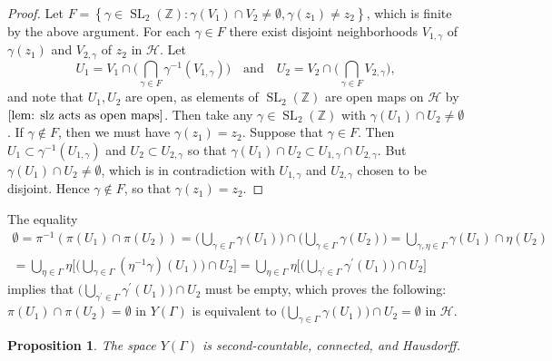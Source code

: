 \documentclass[10pt,leqno,twoside]{article}
\theoremstyle{plain}
\newtheorem{proposition}[lem]{Proposition}
\theoremstyle{definition}
\numberwithin{equation}{section}
\numberwithin{lem}{section}
\newcommand{\cbr}[1]{\left\{#1\right\}}
\DeclareMathOperator{\SL}{SL}
\newcommand{\slz}{\SL_2(\mathbb{Z})}
\begin{document}
\begin{proof}
    Let $F = \cbr{\gamma\in \slz: \gamma(V_1)\cap V_2\neq \emptyset, \gamma(z_1)\neq z_2}$, which is finite by the above argument. For each $\gamma \in F$ there exist disjoint neighborhoods $V_{1,\gamma}$ of $\gamma(z_1)$ and $V_{2,\gamma}$ of $z_2$ in $\mathcal H$. Let \[U_1 = V_1\cap \Bigg(\bigcap_{\gamma\in F}\gamma^{-1}(V_{1,\gamma})\Bigg)\quad\text{and}\quad U_2 = V_2\cap \Bigg(\bigcap_{\gamma\in F}V_{2,\gamma}\Bigg),\] and note that $U_1,U_2$ are open, as elements of $\slz$ are open maps on $\mathcal H$ by $\cref{lem: slz acts as open maps}$. Then take any $\gamma\in \slz$ with $\gamma(U_1)\cap U_2\neq \emptyset$. If $\gamma\not\in F$, then we must have $\gamma(z_1) = z_2$. Suppose that $\gamma\in F$. Then $U_1\subset \gamma^{-1}(U_{1,\gamma})$ and $U_2\subset U_{2,\gamma}$ so that $ \gamma(U_1)\cap U_2\subset U_{1,\gamma}\cap U_{2,\gamma}$. But $\gamma(U_1)\cap U_2\neq \emptyset$, which is in contradiction with $U_{1,\gamma}$ and $U_{2,\gamma}$ chosen to be disjoint. Hence $\gamma\not\in F$, so that $\gamma(z_1)= z_2$.
\end{proof}

The equality
\begin{multline}\label{eqn: disjoint nbds in modular curve}
    \emptyset = \pi^{-1}(\pi(U_1)\cap \pi(U_2)) = \Bigg(\bigcup_{\gamma\in \varGamma}\gamma(U_1)\Bigg)\cap \Bigg(\bigcup_{\gamma\in \varGamma}\gamma(U_2)\Bigg) = \bigcup_{\gamma,\eta\in \varGamma}\gamma(U_1)\cap \eta(U_2)\\ = \bigcup_{\eta\in \varGamma}\eta\Bigg[\Bigg(\bigcup_{\gamma\in \varGamma}(\eta^{-1}\gamma)(U_1)\Bigg)\cap U_2\Bigg] = \bigcup_{\eta\in \varGamma}\eta\Bigg[\Bigg(\bigcup_{\gamma^\prime\in \varGamma}\gamma^\prime(U_1)\Bigg)\cap U_2\Bigg]
\end{multline}
implies that $\big(\bigcup_{\gamma^\prime\in \varGamma}\gamma^\prime(U_1)\big)\cap U_2$ must be empty, which proves the following: $\pi(U_1)\cap \pi(U_2)=\emptyset$ in $Y(\varGamma)$ is equivalent to $\big(\bigcup_{\gamma\in \varGamma}\gamma(U_1)\big)\cap U_2 = \emptyset$ in $\mathcal H$.

\begin{proposition}
    The space $Y(\varGamma)$ is second-countable, connected, and Hausdorff.
\end{proposition}
\end{document}
